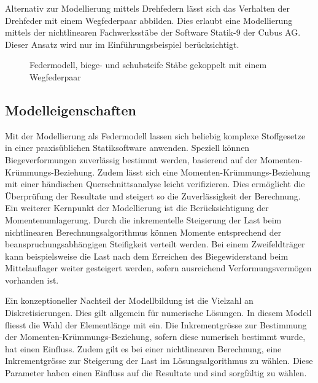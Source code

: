 \documentclass[
  11pt,
  letterpaper,
]{scrreprt}
\begin{document}
Alternativ zur Modellierung mittels Drehfedern lässt sich das Verhalten
der Drehfeder mit einem Wegfederpaar abbilden. Dies erlaubt eine
Modellierung mittels der nichtlinearen Fachwerksstäbe der Software
Statik-9 der Cubus AG. Dieser Ansatz wird nur im Einführungsbeispiel
berücksichtigt.

\begin{figure}[H]


\caption{\label{fig-modell_wegfeder}Federmodell, biege- und schubsteife
Stäbe gekoppelt mit einem Wegfederpaar}

\end{figure}%

\subsection{Modelleigenschaften}\label{modelleigenschaften}

Mit der Modellierung als Federmodell lassen sich beliebig komplexe
Stoffgesetze in einer praxisüblichen Statiksoftware anwenden. Speziell
können Biegeverformungen zuverlässig bestimmt werden, basierend auf der
Momenten-Krümmungs-Beziehung. Zudem lässt sich eine
Momenten-Krümmungs-Beziehung mit einer händischen Querschnittsanalyse
leicht verifizieren. Dies ermöglicht die Überprüfung der Resultate und
steigert so die Zuverlässigkeit der Berechnung. Ein weiterer Kernpunkt
der Modellierung ist die Berücksichtigung der Momentenumlagerung. Durch
die inkrementelle Steigerung der Last beim nichtlinearen
Berechnungsalgorithmus können Momente entsprechend der
beanspruchungsabhängigen Steifigkeit verteilt werden. Bei einem
Zweifeldträger kann beispielsweise die Last nach dem Erreichen des
Biegewiderstand beim Mittelauflager weiter gesteigert werden, sofern
ausreichend Verformungsvermögen vorhanden ist.

Ein konzeptioneller Nachteil der Modellbildung ist die Vielzahl an
Diskretisierungen. Dies gilt allgemein für numerische Lösungen. In
diesem Modell fliesst die Wahl der Elementlänge mit ein. Die
Inkrementgrösse zur Bestimmung der Momenten-Krümmungs-Beziehung, sofern
diese numerisch bestimmt wurde, hat einen Einfluss. Zudem gilt es bei
einer nichtlinearen Berechnung, eine Inkrementgrösse zur Steigerung der
Last im Lösungsalgorithmus zu wählen. Diese Parameter haben einen
Einfluss auf die Resultate und sind sorgfältig zu wählen.
\end{document}
